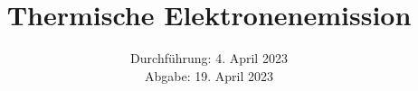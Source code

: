

\subject{\texorpdfstring{\vspace{2ex}}{}V504\texorpdfstring{\vspace{-2ex}}{}} %
\title{Thermische Elektronenemission} %
\date{
	Durchführung: 4. April 2023 %
	\\ Abgabe: 19. April 2023 %
}




\maketitle
\thispagestyle{empty}


\tableofcontents
\newpage







\printbibliography{}

\newpage



